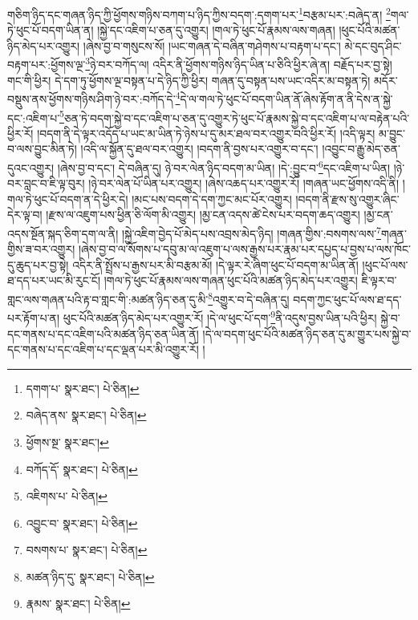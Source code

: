 གཅིག་ཉིད་དང་གཞན་ཉིད་ཀྱི་ཕྱོགས་གཉིས་བཀག་པ་ཉིད་ཀྱིས་བདག་:དགག་པར་\footnote{དགག་པ་  སྣར་ཐང་།  པེ་ཅིན། }བརྩམ་པར་:བཞེད་ན། \footnote{བཞེད་ནས་  སྣར་ཐང་།  པེ་ཅིན། }གལ་ཏེ་ཕུང་པོ་བདག་ཡིན་ན། །སྐྱེ་དང་འཇིག་པ་ཅན་དུ་འགྱུར། །གལ་ཏེ་ཕུང་པོ་རྣམས་ལས་གཞན། །ཕུང་པོའི་མཚན་ཉིད་མེད་པར་འགྱུར། །ཞེས་བྱ་བ་གསུངས་སོ། །ཡང་གཞན་དེ་བཞིན་གཤེགས་པ་བརྟག་པ་དང་། མེ་དང་བུད་ཤིང་བརྟག་པར་:ཕྱོགས་ལྔ་\footnote{ཕྱོགས་སྔ་  སྣར་ཐང་། }ཉེ་བར་བཀོད་ལ། འདིར་ནི་ཕྱོགས་གཉིས་ཉིད་ཡིན་པ་ཅིའི་ཕྱིར་ཞེ་ན། བརྗོད་པར་བྱ་སྟེ། གང་གི་ཕྱིར། དེ་དག་ཏུ་ཕྱོགས་ལྔ་བསྟན་པ་དེ་ཉིད་ཀྱི་ཕྱིར། གཞན་དུ་བསྟན་པས་ཡང་འདིར་མ་བསྟན་ཏེ། མདོར་བསྡུས་ནས་ཕྱོགས་གཉིས་ཤིག་ཉེ་བར་:བཀོད་དེ་\footnote{བཀོད་དོ་  སྣར་ཐང་།  པེ་ཅིན། }དེ་ལ་གལ་ཏེ་ཕུང་པོ་བདག་ཡིན་ནོ་ཞེས་རྟོག་ན་ནི་དེས་ན་སྐྱེ་དང་:འཇིག་པ་\footnote{འཇིགས་པ་  པེ་ཅིན། }ཅན་ཏེ་བདག་སྐྱེ་བ་དང་འཇིག་པ་ཅན་དུ་འགྱུར་ཏེ་ཕུང་པོ་རྣམས་སྐྱེ་བ་དང་འཇིག་པ་ལ་བརྟེན་པའི་ཕྱིར་རོ། །བདག་ནི་དེ་ལྟར་འདོད་པ་ཡང་མ་ཡིན་ཏེ་ཉེས་པ་དུ་མར་ཐལ་བར་འགྱུར་བའི་ཕྱིར་རོ། །འདི་ལྟར། མ་བྱུང་བ་ལས་བྱུང་མིན་ཏེ། །འདི་ལ་སྐྱོན་དུ་ཐལ་བར་འགྱུར། །བདག་ནི་བྱས་པར་འགྱུར་བ་དང་། །འབྱུང་བ་རྒྱུ་མེད་ཅན་དུའང་འགྱུར། །ཞེས་བྱ་བ་དང་། དེ་བཞིན་དུ། ཉེ་བར་ལེན་ཉིད་བདག་མ་ཡིན། །དེ་:བྱུང་བ་\footnote{འབྱུང་བ་  སྣར་ཐང་།  པེ་ཅིན། }དང་འཇིག་པ་ཡིན། །ཉེ་བར་བླང་བ་ཇི་ལྟ་བུར། །ཉེ་བར་ལེན་པོ་ཡིན་པར་འགྱུར། །ཞེས་འཆད་པར་འགྱུར་རོ། །གཞན་ཡང་ཕྱོགས་འདི་ནི། །གལ་ཏེ་ཕུང་པོ་བདག་ན་དེ་ཕྱིར་དེ། །མང་པས་བདག་དེ་དག་ཀྱང་མང་པོར་འགྱུར། །བདག་ནི་རྫས་སུ་འགྱུར་ཞིང་དེར་ལྟ་བ། །རྫས་ལ་འཇུག་པས་ཕྱིན་ཅི་ལོག་མི་འགྱུར། །མྱ་ངན་འདས་ཚེ་ངེས་པར་བདག་ཆད་འགྱུར། །མྱ་ངན་འདས་སྔོན་སྐད་ཅིག་དག་ལ་ནི། །སྐྱེ་འཇིག་བྱེད་པོ་མེད་པས་འབྲས་མེད་ཉིད། །གཞན་གྱིས་:བསགས་ལས་\footnote{བསགས་པ་  སྣར་ཐང་།  པེ་ཅིན། }གཞན་གྱིས་ཟ་བར་འགྱུར། །ཞེས་བྱ་བ་ལ་སོགས་པ་དབུ་མ་ལ་འཇུག་པ་ལས་རྒྱས་པར་རྣམ་པར་དཔྱད་པ་བྱས་པ་ལས་ཁོང་དུ་ཆུད་པར་བྱ་སྟེ། འདིར་ནི་སྤྲོས་པ་རྒྱས་པར་མི་བརྩམ་མོ། །དེ་ལྟར་རེ་ཞིག་ཕུང་པོ་བདག་མ་ཡིན་ནོ། །ཕུང་པོ་ལས་ཐ་དད་པར་ཡང་མི་རུང་ངོ། །གལ་ཏེ་ཕུང་པོ་རྣམས་ལས་གཞན་ཕུང་པོའི་མཚན་ཉིད་མེད་པར་འགྱུར། ཇི་ལྟར་བ་གླང་ལས་གཞན་པའི་རྟ་བ་གླང་གི་:མཚན་ཉིད་ཅན་དུ་མི་\footnote{མཚན་ཉིད་དུ་  སྣར་ཐང་།  པེ་ཅིན། }འགྱུར་བ་དེ་བཞིན་དུ། བདག་ཀྱང་ཕུང་པོ་ལས་ཐ་དད་པར་རྟོག་པ་ན། ཕུང་པོའི་མཚན་ཉིད་མེད་པར་འགྱུར་རོ། །དེ་ལ་ཕུང་པོ་དག་\footnote{རྣམས་  སྣར་ཐང་།  པེ་ཅིན། }ནི་འདུས་བྱས་ཡིན་པའི་ཕྱིར། སྐྱེ་བ་དང་གནས་པ་དང་འཇིག་པའི་མཚན་ཉིད་ཅན་ཡིན་ནོ། །དེ་ལ་བདག་ཕུང་པོའི་མཚན་ཉིད་ཅན་དུ་མ་གྱུར་པས་སྐྱེ་བ་དང་གནས་པ་དང་འཇིག་པ་དང་ལྡན་པར་མི་འགྱུར་རོ། །
